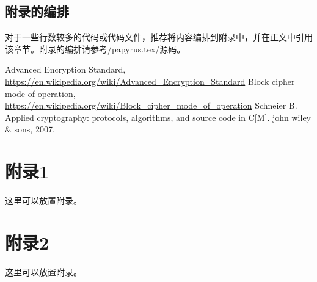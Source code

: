 \documentclass[a4paper,UTF8]{ctexart}
\begin{document}
\subsection{附录的编排}

对于一些行数较多的代码或代码文件，推荐将内容编排到附录中，并在正文中引用该章节。附录的编排请参考\code/papyrus.tex/源码。


\small
\begin{thebibliography}{99}

 Advanced Encryption Standard, \url{https://en.wikipedia.org/wiki/Advanced_Encryption_Standard}
 Block cipher mode of operation, \url{https://en.wikipedia.org/wiki/Block_cipher_mode_of_operation}
 Schneier B. Applied cryptography: protocols, algorithms, and source code in C[M]. john wiley \& sons, 2007.
\end{thebibliography}


\par \vspace{1cm}

\appendix


{\par \noindent \huge \bfseries \appendixname \par}

\section{附录1}

这里可以放置附录。

\section{附录2}

这里可以放置附录。
\end{document}
